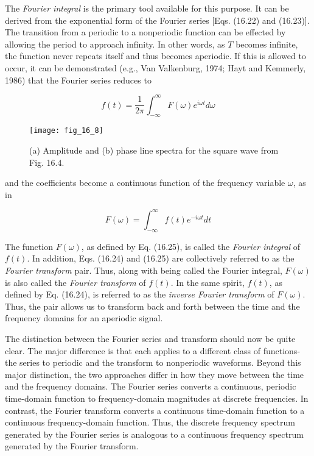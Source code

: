 \documentclass[../main.tex]{subfiles}
\begin{document}
The \textit{Fourier integral} is the primary tool available for this purpose. It can be derived
from the exponential form of the Fourier series [Eqs. (16.22) and (16.23)]. The transition
from a periodic to a nonperiodic function can be effected by allowing the period to approach infinity. In other words, as $T$ becomes infinite, the function never repeats itself and
thus becomes aperiodic. If this is allowed to occur, it can be demonstrated (e.g., Van
Valkenburg, 1974; Hayt and Kemmerly, 1986) that the Fourier series reduces to

\begin{equation}
	\tag{16.24}
	f(t) = \frac{1}{2 \pi} \int ^ \infty _ {-\infty} F(\omega) e ^ {i \omega t} d \omega
\end{equation}

\begin{figure}[H] 
	\centering
	\texttt{[image: fig\_16\_8]}
	\caption{\textsf{(a) Amplitude and (b) phase line spectra for the square wave from Fig. 16.4.}}
	\label{fig:fig_16_8}
\end{figure}

\noindent and the coefficients become a continuous function of the frequency variable $\omega$, as in

\begin{equation}
	\tag{16.25}
	F(\omega) = \int ^ \infty _ {-\infty} f(t)e ^ {-i \omega t} dt
\end{equation}

The function $F(\omega)$, as defined by Eq. (16.25), is called the \textit{Fourier integral} of $f(t)$. In
addition, Eqs. (16.24) and (16.25) are collectively referred to as the \textit{Fourier transform}
pair. Thus, along with being called the Fourier integral, $F(\omega)$ is also called the \textit{Fourier
transform} of $f(t)$. In the same spirit, $f(t)$, as defined by Eq. (16.24), is referred to as the
\textit{inverse Fourier transform} of $F(\omega)$. Thus, the pair allows us to transform back and forth
between the time and the frequency domains for an aperiodic signal.

The distinction between the Fourier series and transform should now be quite clear.
The major difference is that each applies to a different class of functions-the series to periodic and the transform to nonperiodic waveforms. Beyond this major distinction, the two
approaches differ in how they move between the time and the frequency domains. The
Fourier series converts a continuous, periodic time-domain function to frequency-domain
magnitudes at discrete frequencies. In contrast, the Fourier transform converts a continuous time-domain function to a continuous frequency-domain function. Thus, the discrete
frequency spectrum generated by the Fourier series is analogous to a continuous frequency
spectrum generated by the Fourier transform.
\end{document}
